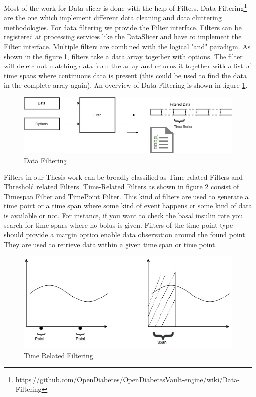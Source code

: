 \documentclass[article,type=msc,colorback,accentcolor=tud9c,twoside,11pt]{tudthesis}
\begin{document}
	Most of the work for Data slicer is done with the help of Filters. Data Filtering\footnote{https://github.com/OpenDiabetes/OpenDiabetesVault-engine/wiki/Data-Filtering} are the one which implement different data cleaning and data cluttering methodologies. For data filtering we provide the Filter interface. Filters can be registered at processing services like the DataSlicer and have to implement the Filter interface. Multiple filters are combined with the logical "and" paradigm. As shown in the figure \ref{fig:Filters}, filters take a data array together with options. The filter will delete not matching data from the array and returns it together with a list of time spans where continuous data is present (this could be used to find the data in the complete array again).  An overview of Data Filtering is shown in figure \ref{fig:Filters}.
	\begin{figure}[h]
		\centering
		\includegraphics[scale=0.7]{Filters.jpg}
		\caption{Data Filtering}
		\label{fig:Filters}
	\end{figure}
	Filters in our Thesis work can be broadly classified as Time related Filters and
	Threshold related Filters. Time-Related Filters as shown in figure \ref{fig:TimeRelated} consist of Timespan Filter and TimePoint Filter. This kind of filters are used to generate a time point or a time span where some kind of event happens or some kind of data is available or not. For instance, if you want to check the basal insulin rate you search for time spans where no bolus is given. Filters of the time point type should provide a margin option enable data observation around the found point. They are used to retrieve data within a given time span or time point.
	\begin{figure}[h]
		\centering
		\includegraphics[scale=0.7]{TimeRelated.jpg}
		\caption{Time Related Filtering}
		\label{fig:TimeRelated}
	\end{figure}
\end{document}
